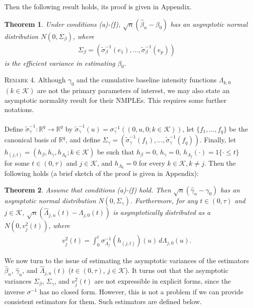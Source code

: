 \documentclass{statsoc}
\newtheorem{theorem}{Theorem}[section]
\begin{document}
Then the following result holds, its proof is given in Appendix.

\begin{theorem}\label{asympn}
Under conditions (a)-(f), $\sqrt n(\widehat\beta_n-\beta_0)$ has an asymptotic normal distribution $N(0,\Sigma_\beta)$, where
\begin{eqnarray*}
\Sigma_\beta=(\widetilde \sigma_\beta^{-1}(e_1),\ldots,\widetilde \sigma_\beta^{-1}(e_p))
\end{eqnarray*}
is the efficient variance in estimating $\beta_0$.
\end{theorem}

\textsc{Remark 4.} Although $\gamma_0$ and the cumulative baseline intensity functions $\Lambda_{k,0}$ $(k\in\mathcal K)$ are not the primary parameters of interest, we may also state an asymptotic normality result for their NMPLEs. This requires some further notations.
\\
\\
Define $\widetilde \sigma_\gamma^{-1}:{\ensuremath{\mathbb{R}}}^q\rightarrow {\ensuremath{\mathbb{R}}}^q$ by $\widetilde \sigma_\gamma^{-1}(u)= \sigma_\gamma^{-1}((0, u, 0; k \in \mathcal K))$, let $\{f_1,\ldots,f_q\}$ be the canonical basis of ${\ensuremath{\mathbb{R}}}^q$, and define $\Sigma_\gamma=(\widetilde \sigma_\gamma^{-1}(f_1),\ldots,\widetilde \sigma_\gamma^{-1}(f_q))$. Finally, let $h_{(j,t)}=(h_\beta, h_\gamma, h_{\Lambda_k}; k\in\mathcal K)$ be such that $h_\beta=0$, $h_\gamma=0$, $h_{\Lambda_j}(\cdot)=1\{\cdot\leq t\}$ for some $t\in(0,\tau)$ and $j\in\mathcal K$, and $h_{\Lambda_k}=0$ for every $k\in\mathcal K, k\neq j$. Then the following holds (a brief sketch of the proof is given in Appendix):

\begin{theorem}\label{asympnpn}
Assume that conditions (a)-(f) hold. Then $\sqrt n(\widehat\gamma_n-\gamma_0)$ has an asymptotic normal distribution $N(0,\Sigma_\gamma)$. Furthermore, for any $t\in(0,\tau)$ and $j\in\mathcal K$, $\sqrt n(\widehat\Lambda_{j,n}(t)-\Lambda_{j,0}(t))$ is asymptotically distributed as a $N(0, v_j^2(t))$, where
\begin{eqnarray*}
v_j^2(t)=\int_0^t \sigma_{\Lambda_j}^{-1}(h_{(j,t)})(u)\, d\Lambda_{j,0}(u).
\end{eqnarray*}
\end{theorem}

We now turn to the issue of estimating the asymptotic variances of the estimators $\widehat\beta_n$, $\widehat\gamma_n$, and $\widehat\Lambda_{j,n}(t)$ ($t\in(0,\tau)$, $j\in\mathcal K$). It turns out that the asymptotic variances $\Sigma_\beta$, $\Sigma_\gamma$, and $v_j^2(t)$ are not expressible in explicit forms, since the inverse $\sigma^{-1}$ has no closed form. However, this is not a problem if we can provide consistent estimators for them. Such estimators are defined below.
\end{document}
